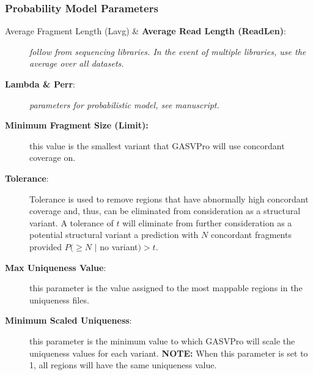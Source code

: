 \documentclass[11pt]{article}
\begin{document}
\subsubsection{Probability Model Parameters}
\begin {description}
\item[Average Fragment Length (Lavg) \& {\bf Average Read Length (ReadLen)}:] {\em follow from sequencing libraries. In the event of multiple libraries, use the average over all datasets.}
\item[{\bf Lambda \& Perr}:] {\em parameters for probabilistic model, see manuscript.}
\item[\bf Minimum Fragment Size (Limit):] this value is the smallest variant that GASVPro will use concordant coverage on.
\item[{\bf Tolerance}: ] Tolerance is used to remove regions that have abnormally high
concordant coverage and, thus, can be eliminated from consideration
as a structural variant. A tolerance of $t$ will eliminate from further consideration as a potential structural variant a prediction with $N$ concordant fragments provided $P(\ge N$ $|$ no variant$) > t$.
\item[{\bf Max Uniqueness Value}:]  this parameter is the value assigned to the most mappable regions in the uniqueness files. 
\item[{\bf Minimum Scaled Uniqueness}:]  this parameter is the minimum value to which GASVPro will scale the uniqueness values for each variant. {\bf NOTE:} When this parameter is set to 1, all regions will have the same uniqueness value. 
\end{description}
\end{document}
